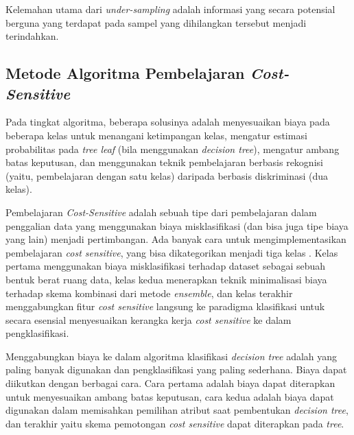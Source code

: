 Kelemahan utama dari \textit{under-sampling} adalah informasi yang secara
potensial berguna yang terdapat pada sampel yang dihilangkan tersebut menjadi
terindahkan.

\label{subsec:algcostsensitive}
\subsection{Metode Algoritma Pembelajaran \textit{Cost-Sensitive}}

Pada tingkat algoritma, beberapa solusinya adalah menyesuaikan biaya pada
beberapa kelas untuk menangani ketimpangan kelas, mengatur estimasi
probabilitas pada \textit{tree leaf} (bila menggunakan \textit{decision tree}),
mengatur ambang batas keputusan, dan menggunakan teknik pembelajaran berbasis
rekognisi (yaitu, pembelajaran dengan satu kelas) daripada berbasis
diskriminasi (dua kelas).

Pembelajaran \textit{Cost-Sensitive} adalah sebuah tipe dari pembelajaran dalam
penggalian data yang menggunakan biaya misklasifikasi (dan bisa juga tipe biaya
yang lain) menjadi pertimbangan.
Ada banyak cara untuk mengimplementasikan pembelajaran \textit{cost sensitive},
yang bisa dikategorikan menjadi tiga kelas \parencite{he2009learning}.
Kelas pertama menggunakan biaya misklasifikasi terhadap dataset sebagai sebuah
bentuk berat ruang data, kelas kedua menerapkan teknik minimalisasi biaya
terhadap skema kombinasi dari metode \textit{ensemble}, dan kelas terakhir
menggabungkan fitur \textit{cost sensitive} langsung ke paradigma klasifikasi
untuk secara esensial menyesuaikan kerangka kerja \textit{cost sensitive} ke
dalam pengklasifikasi.

Menggabungkan biaya ke dalam algoritma klasifikasi \textit{decision tree}
adalah yang paling banyak digunakan dan pengklasifikasi yang paling sederhana.
Biaya dapat diikutkan dengan berbagai cara.  Cara pertama adalah biaya dapat
diterapkan untuk menyesuaikan ambang batas keputusan, cara kedua adalah biaya
dapat digunakan dalam memisahkan pemilihan atribut saat pembentukan
\textit{decision tree}, dan terakhir yaitu skema pemotongan \textit{cost
sensitive} dapat diterapkan pada \textit{tree}.
